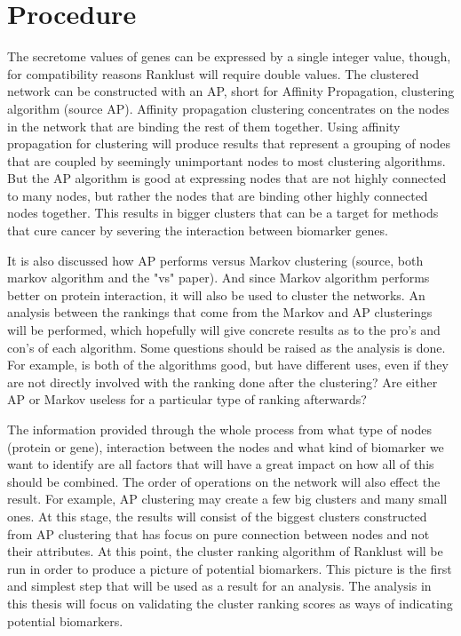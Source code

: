 \documentclass[UKenglish]{ifimaster}
\begin{document}

\part{Procedure}
The secretome values of genes can be expressed by a single integer value, though, for compatibility reasons Ranklust
will require double values. The clustered network can be constructed with an AP, short for Affinity Propagation,
clustering algorithm (source AP). Affinity propagation clustering concentrates on the nodes in the network that are
binding the rest of them together. Using affinity propagation for clustering will produce results that represent a
grouping of nodes that are coupled by seemingly unimportant nodes to most clustering algorithms. But the AP algorithm is
good at expressing nodes that are not highly connected to many nodes, but rather the nodes that are binding other highly
connected nodes together. This results in bigger clusters that can be a target for methods that cure cancer by severing
the interaction between biomarker genes.

It is also discussed how AP performs versus Markov clustering (source, both markov algorithm and the "vs" paper). And
since Markov algorithm performs better on protein interaction, it will also be used to cluster the networks. An analysis
between the rankings that come from the Markov and AP clusterings will be performed, which hopefully will give concrete
results as to the pro's and con's of each algorithm. Some questions should be raised as the analysis is done. For
example, is both of the algorithms good, but have different uses, even if they are not directly involved with the
ranking done after the clustering? Are either AP or Markov useless for a particular type of ranking afterwards?

The information provided through the whole process from what type of nodes (protein or gene), interaction between the
nodes and what kind of biomarker we want to identify are all factors that will have a great impact on how all of this
should be combined. The order of operations on the network will also effect the result. For example, AP clustering may
create a few big clusters and many small ones. At this stage, the results will consist of the biggest clusters
constructed from AP clustering that has focus on pure connection between nodes and not their attributes. At this point,
the cluster ranking algorithm of Ranklust will be run in order to produce a picture of potential biomarkers. This
picture is the first and simplest step that will be used as a result for an analysis. The analysis in this thesis will
focus on validating the cluster ranking scores as ways of indicating potential biomarkers. 
\end{document}
